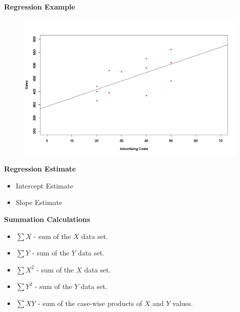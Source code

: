 \documentclass[]{report}
\begin{document}
\textbf{Regression Example}
\begin{center}
	\begin{figure}
		\includegraphics[scale=0.3]{images/12Bplot2.jpeg}\\
	\end{figure}
\end{center}





\noindent \textbf{Regression Estimate}
\begin{itemize}
	\item Intercept Estimate
	\item Slope Estimate
\end{itemize}

\noindent \textbf{Summation Calculations}
\begin{itemize}
	\item $\sum X$ - sum of the $X$ data set.
	\item $\sum Y$ - sum of the $Y$ data set.
	\item $\sum X^2$ - sum of the $X$ data set.
	\item $\sum Y^2$ - sum of the $Y$ data set.
	\item $\sum XY$ - sum of the case-wise products  of $X$ and $Y$ values.
\end{itemize}
\end{document}
